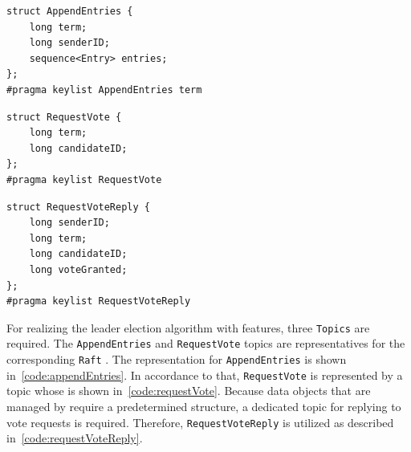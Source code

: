 \lstset{language=C}
\begin{lstlisting}[caption={\abr{IDL} definition for the \texttt{AppendEntries} topic. The \texttt{term} variable represents the latest term that the replica has seen, while the \texttt{senderID} encodes which replica sent this message. With \texttt{entries}, a payload can be send via the topic. This is used by a leader for instructing its followers to process certain data. The \texttt{entries} field is left empty for heartbeat messages.}, label=code:appendEntries]
struct AppendEntries {
    long term;
    long senderID;
    sequence<Entry> entries;
};
#pragma keylist AppendEntries term
\end{lstlisting}

\begin{lstlisting}[caption={\abr{IDL} definition for the \texttt{RequestVote} topic. The \texttt{term} variable represents the candidate's term, while \texttt{candidateID} encodes the candidate that requested the vote.}, label=code:requestVote]
struct RequestVote {
    long term;
    long candidateID;
};
#pragma keylist RequestVote
\end{lstlisting}

\begin{lstlisting}[caption={\abr{IDL} definition for the \texttt{RequestVoteReply} topic. The \texttt{term} encodes the sender's term for the candidate to update itself. \texttt{voteGranted} shows whether the replica granted the vote request for the given term. The \texttt{candidateID} and \texttt{senderID} are used to identify which replica granted the vote for which replica respectively.}, label=code:requestVoteReply]
struct RequestVoteReply {
    long senderID;
    long term;
    long candidateID;
    long voteGranted;
};
#pragma keylist RequestVoteReply
\end{lstlisting}

For realizing the leader election algorithm with  features, three \texttt{Topics} are required.
The \texttt{AppendEntries} and \texttt{RequestVote} topics are representatives for the corresponding \texttt{Raft} .
The  representation for \texttt{AppendEntries} is shown in~\autoref{code:appendEntries}.
In accordance to that, \texttt{RequestVote} is represented by a topic whose  is shown in~\autoref{code:requestVote}.
Because data objects that are managed by  require a predetermined structure, a dedicated topic for replying to vote requests is required.
Therefore, \texttt{RequestVoteReply} is utilized as described in~\autoref{code:requestVoteReply}.

